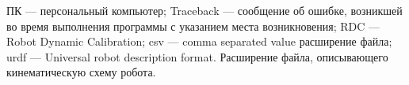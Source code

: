 \newpage
\begin{abbreviations}


ПК --- персональный компьютер;
Traceback --- сообщение об ошибке, возникшей во время выполнения программы с указанием места возникновения;
RDC --- Robot Dynamic Calibration;
csv --- comma separated value расширение файла;
urdf --- Universal robot description format. Расширение файла, описывающего кинематическую схему робота.

\end{abbreviations}
